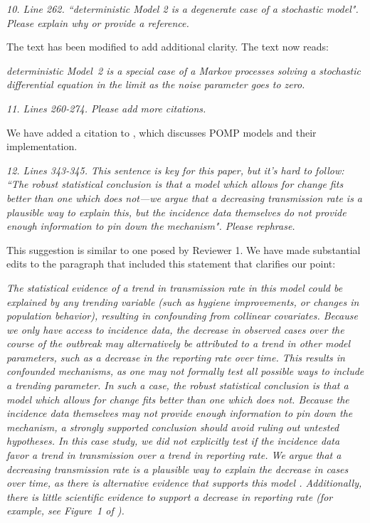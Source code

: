\documentclass[11pt]{article}
\newcommand\report[1]{{\color{mygreen} \vspace{1mm}\hspace{0.25in}\parbox{6in}{\em #1}}}
\newcommand\article[1]{{\color{blue} \vspace{1mm}\hspace{0.25in}\parbox{6in}{\em #1}}}
\begin{document}
\report{
  10. Line 262. ``deterministic Model 2 is a degenerate case of a stochastic model". Please explain why or provide a reference.
}

The text has been modified to add additional clarity. The text now reads:

\article{deterministic Model~2 is a special case of a Markov processes solving a stochastic differential equation in the limit as the noise parameter goes to zero.}

\report{
  11. Lines 260-274. Please add more citations.
}

We have added a citation to \cite{king16}, which discusses POMP models and their implementation.

\report{
  12. Lines 343-345. This sentence is key for this paper, but it’s hard to follow: ``The robust statistical conclusion is that a model which allows for change fits better than one which does not—we argue that a decreasing transmission rate is a plausible way to explain this, but the incidence data themselves do not provide enough information to pin down the mechanism". Please rephrase.
}

This suggestion is similar to one posed by Reviewer 1. We have made substantial edits to the paragraph that included this statement that clarifies our point:

\article{The statistical evidence of a trend in transmission rate in this model could be explained by any trending variable (such as hygiene improvements, or changes in population behavior), resulting in confounding from collinear covariates. Because we only have access to incidence data, the decrease in observed cases over the course of the outbreak may alternatively be attributed to a trend in other model parameters, such as a decrease in the reporting rate over time.
This results in confounded mechanisms, as one may not formally test all possible ways to include a trending parameter. In such a case, the robust statistical conclusion is that a model which allows for change fits better than one which does not. Because the incidence data themselves may not provide enough information to pin down the mechanism, a strongly supported conclusion should avoid ruling out untested hypotheses. In this case study, we did not explicitly test if the incidence data favor a trend in transmission over a trend in reporting rate. We argue that a decreasing transmission rate is a plausible way to explain the decrease in cases over time, as there is alternative evidence that supports this model \cite{rebaudet19CATI,rebaudet21,michel19}. Additionally, there is little scientific evidence to support a decrease in reporting rate (for example, see Figure~1 of \cite{rebaudet21}).}
\end{document}
